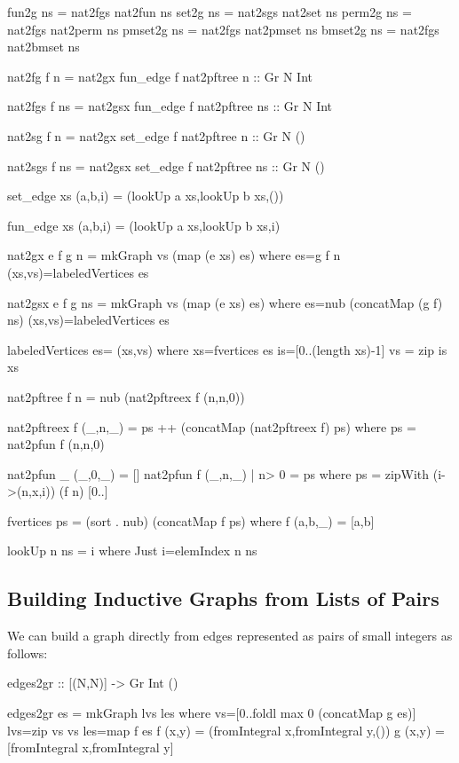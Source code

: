\documentclass[]{INCLUDES/llncs}
\begin{document}
\begin{code}
fun2g ns = nat2fgs nat2fun ns
set2g ns = nat2sgs nat2set ns
perm2g ns = nat2fgs nat2perm ns
pmset2g ns = nat2fgs nat2pmset ns
bmset2g ns = nat2fgs nat2bmset ns

nat2fg f n = nat2gx fun_edge f nat2pftree n :: Gr N Int

nat2fgs f ns = nat2gsx fun_edge f nat2pftree ns :: Gr N Int

nat2sg f n = nat2gx set_edge f nat2pftree n :: Gr N ()

nat2sgs f ns = nat2gsx set_edge f nat2pftree ns :: Gr N ()

set_edge xs (a,b,i) = (lookUp a xs,lookUp b xs,())

fun_edge xs (a,b,i) = (lookUp a xs,lookUp b xs,i)

nat2gx e f g n = mkGraph vs  (map (e xs) es) where 
  es=g f n
  (xs,vs)=labeledVertices es

nat2gsx e f g ns = mkGraph vs  (map (e xs) es)  where 
  es=nub (concatMap (g f) ns)
  (xs,vs)=labeledVertices es
  
labeledVertices es= (xs,vs) where  
  xs=fvertices es
  is=[0..(length xs)-1]
  vs = zip is xs
     
nat2pftree f n = nub (nat2pftreex f (n,n,0))

nat2pftreex f (_,n,_) = ps ++ (concatMap (nat2pftreex f) ps) where
  ps = nat2pfun f (n,n,0)

nat2pfun _ (_,0,_) = []
nat2pfun f (_,n,_) | n> 0 = ps where 
  ps = zipWith (\x i->(n,x,i)) (f n) [0..]

fvertices ps = (sort . nub) (concatMap f ps) where
  f (a,b,_) = [a,b]

lookUp n ns = i where Just i=elemIndex n ns
\end{code}

\subsection*{Building Inductive Graphs from Lists of Pairs}
We can build a graph directly from edges represented as pairs of small integers
as follows:
\begin{code}
edges2gr ::  [(N,N)] -> Gr Int ()

edges2gr es = mkGraph lvs les where 
  vs=[0..foldl max 0 (concatMap g es)]
  lvs=zip vs vs
  les=map f es
  f (x,y) = (fromIntegral x,fromIntegral y,())
  g (x,y) = [fromIntegral x,fromIntegral y]
\end{code}
\end{document}
